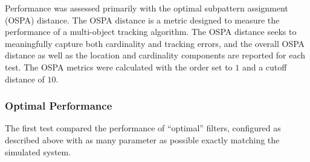 \documentclass{article}
\begin{document}
Performance was assessed primarily with the optimal subpattern assignment (OSPA)\cite{OSPA} distance. The OSPA distance is a metric designed to measure the performance of a multi-object tracking algorithm. The OSPA distance seeks to meaningfully capture both cardinality and tracking errors, and the overall OSPA distance as well as the location and cardinality components are reported for each test. The OSPA metrics were calculated with the order set to $1$ and  a cutoff distance of $10$.

\subsubsection*{Optimal Performance}
The first test compared the performance of ``optimal'' filters, configured as described above with as many parameter as possible exactly matching the simulated system.
\end{document}
